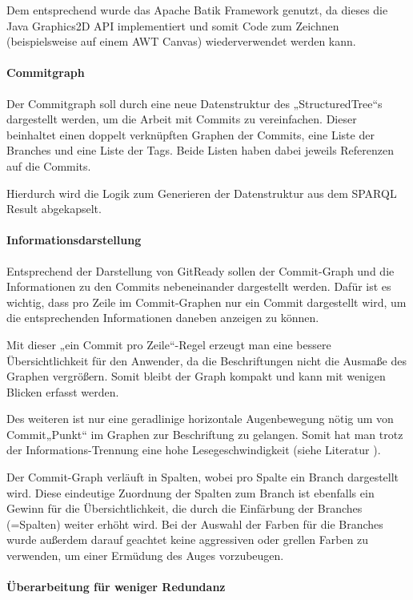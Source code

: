 \documentclass[color, ddc]{tudscrreprt}
\begin{document}
Dem entsprechend wurde das Apache Batik Framework genutzt, da dieses die Java Graphics2D API implementiert und somit Code zum Zeichnen (beispielsweise auf einem AWT Canvas) wiederverwendet werden kann.

\paragraph{Commitgraph}
Der Commitgraph soll durch eine neue Datenstruktur des „StructuredTree“s dargestellt werden, um die Arbeit mit Commits zu vereinfachen. Dieser beinhaltet einen doppelt verknüpften Graphen der Commits, eine Liste der Branches und eine Liste der Tags. Beide Listen haben dabei jeweils Referenzen auf die Commits.

Hierdurch wird die Logik zum Generieren der Datenstruktur aus dem SPARQL Result abgekapselt.

\paragraph{Informationsdarstellung}

Entsprechend der Darstellung von GitReady sollen der Commit-Graph und die Informationen zu den Commits nebeneinander dargestellt werden. Dafür ist es wichtig, dass pro Zeile im Commit-Graphen nur ein Commit dargestellt wird, um die entsprechenden Informationen daneben anzeigen zu können.

Mit dieser „ein Commit pro Zeile“-Regel erzeugt man eine bessere Übersichtlichkeit für den Anwender, da die Beschriftungen nicht die Ausmaße des Graphen vergrößern. Somit bleibt der Graph kompakt und kann mit wenigen Blicken erfasst werden.

Des weiteren ist nur eine geradlinige horizontale Augenbewegung nötig um von Commit\-„Punkt“ im Graphen zur Beschriftung zu gelangen. Somit hat man trotz der Informations-Trennung eine hohe Lesegeschwindigkeit (siehe Literatur \cite{goldberg:visualization-evaluation}).

Der Commit-Graph verläuft in Spalten, wobei pro Spalte ein Branch dargestellt wird. Diese eindeutige Zuordnung der Spalten zum Branch ist ebenfalls ein Gewinn für die Übersichtlichkeit, die durch die Einfärbung der Branches (=Spalten) weiter erhöht wird. Bei der Auswahl der Farben für die Branches wurde außerdem darauf geachtet keine aggressiven oder grellen Farben zu verwenden, um einer Ermüdung des Auges vorzubeugen.

\paragraph{Überarbeitung für weniger Redundanz}
\end{document}
